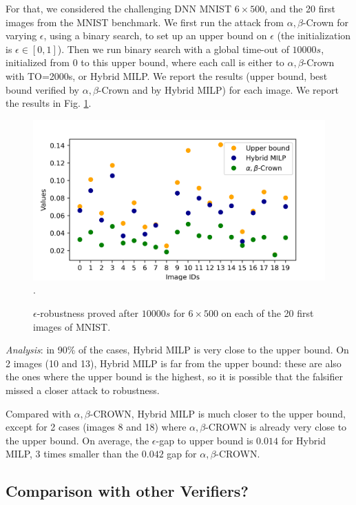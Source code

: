 For that, we considered the challenging DNN MNIST $6 \times 500$, and the 20 first images from the MNIST benchmark. We first run the attack from $\alpha,\beta$-Crown for varying $\epsilon$, using a binary search, to set up an upper bound on $\epsilon$ (the initialization is $\epsilon \in [0,1]$).
Then we run binary search with a global time-out of $10 000s$, initialized from $0$ to this upper bound, where each call is either to $\alpha,\beta$-Crown with TO=2000s, or Hybrid MILP.
We report the results (upper bound, best bound verified by $\alpha,\beta$-Crown and by Hybrid MILP) for each image. We report the results in Fig. \ref{fig2}.

\begin{figure}[t!]
	\begin{centering}
\includegraphics[scale=0.8]{epsilon.png}.
\caption{$\epsilon$-robustness proved after $10 000s$ for $6 \times 500$ on each of the 20 first images of MNIST.}
\label{fig2}
	\end{centering}
\end{figure}

{\em Analysis}: in 90\% of the cases, Hybrid MILP is very close to the upper bound. On 2 images (10 and 13), Hybrid MILP is far from the upper bound: these are also the ones where the upper bound is the highest, so it is possible that the falsifier missed a closer attack to robustness.

Compared with $\alpha,\beta$-CROWN, Hybrid MILP is much closer to the upper bound, except for 2 cases (images 8 and 18) where $\alpha,\beta$-CROWN is already very close to the upper bound. On average, the $\epsilon$-gap to upper bound is $0.014$ for Hybrid MILP, 3 times smaller than the $0.042$ gap for $\alpha,\beta$-CROWN.



\subsection{Comparison with other Verifiers?}

